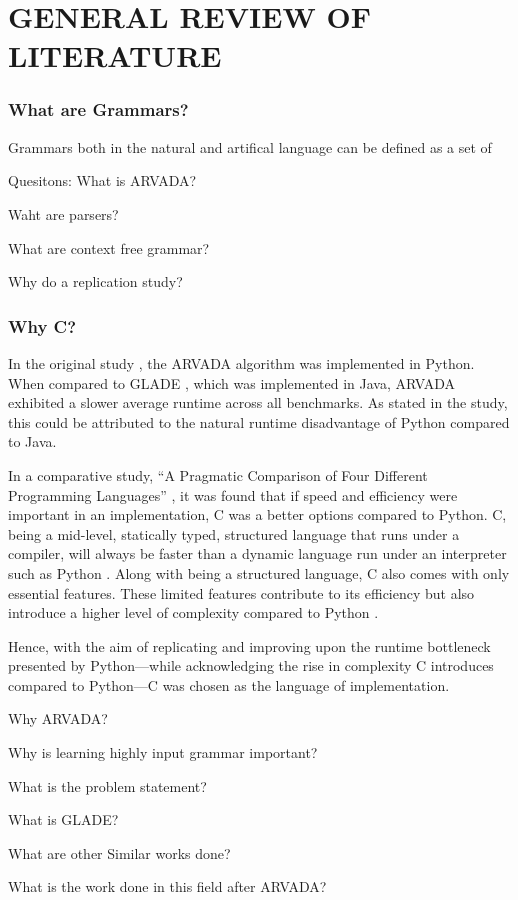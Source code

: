 \chapter{GENERAL REVIEW OF LITERATURE}

\subsection{What are Grammars?}

Grammars both in the natural and artifical language can be defined as a set of 

Quesitons:
What is ARVADA?

Waht are parsers?

What are context free grammar?

Why do a replication study?

\subsection{Why C?}

In the original study \cite{kulkarniLearningHighlyRecursive2021}, the ARVADA algorithm was implemented in Python. When compared to GLADE \cite{bastaniSynthesizingProgramInput}, which was implemented in Java, ARVADA exhibited a slower average runtime across all benchmarks. As stated in the study, this could be attributed to the natural runtime disadvantage of Python compared to Java.

\vspace{\baselineskip}
In a comparative study, \enquote{A Pragmatic Comparison of Four Different Programming Languages} \cite{aliPragmaticComparisonFour2021}, it was found that if speed and efficiency were important in an implementation, C was a better options compared to Python. C, being a mid-level, statically typed, structured language that runs under a compiler, will always be faster than a dynamic language run under an interpreter such as Python \cite{kumarPythonLanguageComparison2022}. Along with being a structured language, C also comes with only essential features. These limited features contribute to its efficiency but also introduce a higher level of complexity compared to Python \cite{aliPragmaticComparisonFour2021}\cite{kumarPythonLanguageComparison2022}.

\vspace{\baselineskip}
Hence, with the aim of replicating and improving upon the runtime bottleneck presented by Python—while acknowledging the rise in complexity C introduces compared to Python—C was chosen as the language of implementation.

Why ARVADA?

Why is learning highly input grammar important?

What is the problem statement?

What is GLADE?

What are other Similar works done?

What is the work done in this field after ARVADA?



